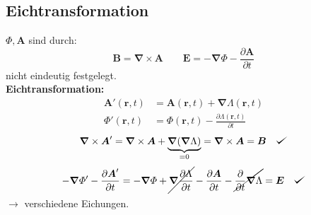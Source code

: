 \documentclass[titlepage,11pt,a4paper,ngerman]{report}
\def\checkmark{\tikz\fill[scale=0.4](0,.35) -- (.25,0) -- (1,.7) -- (.25,.15) -- cycle;}
\newcommand{\ub}[1]{\underbrace{#1}}
\newcommand{\prt}[2]{\frac{\partial #1}{\partial #2}}
\renewcommand{\Phi}{\varPhi}
\renewcommand{\vec}[1]{\boldsymbol{#1}}
\newcommand{\vabla}{\boldsymbol{\nabla}}
\begin{document}
\subsection{Eichtransformation}

$ \Phi, \vec{A} $ sind durch:
\begin{equation*}
\vec{B} = \vabla \times \vec{A} \qquad \vec{E} = - \vabla \Phi - \prt{\vec{A}}{t}
\end{equation*}
nicht eindeutig festgelegt.\\[5pt]
\textbf{Eichtransformation:}
\begin{align*}
\vec{A}'(\vec{r},t) &= \vec{A}(\vec{r},t) + \vabla \Lambda(\vec{r},t)\\
\Phi'(\vec{r},t) &= \Phi(\vec{r},t) - \prt{\Lambda(\vec{r},t)}{t}
\end{align*}
\begin{equation*}
\vabla \times \vec{A}' = \vabla \times \vec{A} + \ub{ \vabla (\vabla \Lambda)}_{=0} = \vabla \times \vec{A} = \vec{B} \quad \checkmark
\end{equation*}
\begin{equation*}
- \vabla \Phi' - \prt{\vec{A}'}{t} = - \vabla \Phi + \cancel{\vabla \prt{\Lambda}{t}} - \prt{\vec{A}}{t} - \cancel{\prt{}{t} \vabla \Lambda} = \vec{E} \quad \checkmark 
\end{equation*}
$ \rightarrow $ verschiedene Eichungen.
\end{document}
